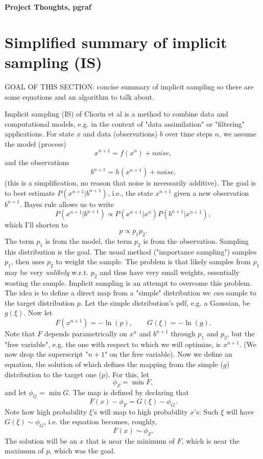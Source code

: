 \documentclass[11pt]{article}
\begin{document}
\begin{center}
{\Large{\textbf{Project Thoughts, pgraf}}}
\end{center}

\section{Simplified summary of implicit sampling (IS)}
GOAL OF THIS SECTION: concise summary of implicit sampling so there are some equations and an algorithm to talk about.

Implicit sampling (IS) of Chorin et al is a method to combine data and computational models, e.g. in the context of "data assimilation" or
"filtering" applications.   
For state $x$ and data (observations) $b$ over time steps $n$, we assume the model (process)
$$ x^{n+1} = f(x^{n}) + noise ,$$
and the observations
$$ b^{n+1} = h(x^{n+1}) + noise.$$
(this is a simplification, no reason that noise is necessarily additive). 
The goal is to best estimate $P(x^{n+1} | b^{n+1})$, i.e., the state $x^{n+1}$ given a new observation $b^{n+1}$.  
Bayes rule allows us to write
$$ P(x^{n+1} | b^{n+1}) \propto P(x^{n+1} | x^{n})  P(b^{n+1} | x^{n+1}),$$
which I'll shorten to
$$ p \propto p_1 p_2. $$
The term $p_1$ is from the model, the term $p_2$ is from the observation.
Sampling this distribution is the goal.  The usual method ("importance sampling") samples $p_1$, then uses $p_2$ to weight the sample.
The problem is that likely samples from $p_1$ may be very \emph{unlikely} w.r.t. $p_2$ and thus have very small weights, essentially wasting the sample.
Implicit sampling is an attempt to overcome this problem.
The idea is to define a direct map from a "simple" distribution we \emph{can} sample to the target distribution $p$.
Let the simple distribution's pdf, e.g. a Gaussian, be $g(\xi)$.
Now let
$$ F(x^{n+1}) = -\ln(p), \qquad G(\xi)= -\ln(g).$$
Note that $F$ depends parametrically on $x^n$ and $b^{n+1}$ through $p_1$ and $p_2$, but the "free variable", e.g. the
one with respect to which we will optimize, is $x^{n+1}$. (We now drop the superscript "$n+1$" on the free variable).
Now we define an equation, the solution of which defines the mapping from the simple ($g$) distribution to the target one ($p$).  For this,
let 
\begin{equation}
   \phi_F = \min F,
\label{eqn1}
\end{equation} 
and let $\phi_G = \min G$.  The map is defined by declaring that
\begin{equation}
   F(x) - \phi_F = G(\xi) - \phi_G.
\label{eqn2}
\end{equation}
Note how high probability $\xi$'s will map to high probability $x$'s:  Such $\xi$ will have $G(\xi) \sim \phi_G$, i.e. the equation becomes, roughly,
$$ F(x) \sim \phi_F.$$
The solution will be an $x$ that is near the minimum of $F$, which is near the maximum of $p$, which was the goal.
\end{document}
